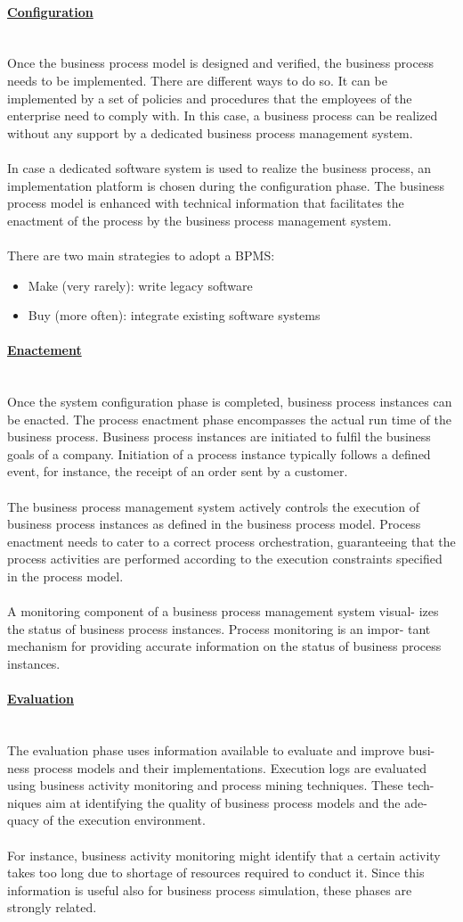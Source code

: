\documentclass[10pt,a4paper]{article}
\newcommand{\myparagraph}[1]{\paragraph{\uline{#1}}\mbox{}\\[0.05in]}
\begin{document}
\myparagraph{Configuration}
Once the business process model is designed and verified, the business process needs to be implemented. There are different ways to do so. It can be implemented by a set of policies and procedures that the employees of the enterprise need to comply with. In this case, a business process can be realized without any support by a dedicated business process management system. \\ \\ 
In case a dedicated software system is used to realize the business process, an implementation platform is chosen during the configuration phase. The business process model is enhanced with technical information that facilitates the enactment of the process by the business process management system. \\ \\
There are two main strategies to adopt a BPMS:
\begin{itemize}
	\item Make (very rarely): write legacy software
	\item Buy (more often): integrate existing software systems
\end{itemize}
\myparagraph{Enactement}
Once the system configuration phase is completed, business process instances can be enacted. The process enactment phase encompasses the actual run time of the business process. Business process instances are initiated to fulfil the business goals of a company. Initiation of a process instance typically follows a defined event, for instance, the receipt of an order sent by a customer. \\ \\ 
The business process management system actively controls the execution of business process instances as defined in the business process model. Process enactment needs to cater to a correct process orchestration, guaranteeing that the process activities are performed according to the execution constraints specified in the process model.
\\ \\
A monitoring component of a business process management system visual- izes the status of business process instances. Process monitoring is an impor- tant mechanism for providing accurate information on the status of business process instances.
\myparagraph{Evaluation}
The evaluation phase uses information available to evaluate and improve busi- ness process models and their implementations. Execution logs are evaluated using business activity monitoring and process mining techniques. These tech- niques aim at identifying the quality of business process models and the ade- quacy of the execution environment. \\ \\
For instance, business activity monitoring might identify that a certain activity takes too long due to shortage of resources required to conduct it. Since this information is useful also for business process simulation, these phases are strongly related.
\pagebreak
\end{document}

